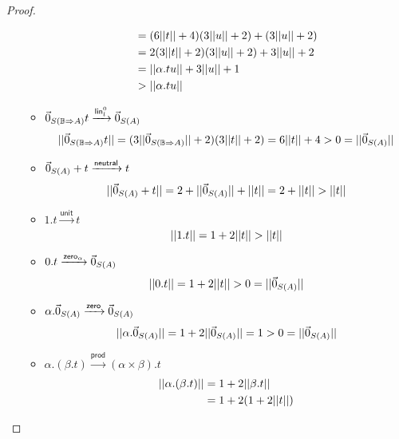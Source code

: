 \begin{proof}
\begin{itemize}
\begin{itemize}
\begin{equation*}
\begin{split}
            & = (6 ||t|| + 4)(3 ||u|| + 2) + (3 ||u|| + 2) \\
            & = 2 (3 ||t|| + 2)(3 ||u|| + 2) + 3 ||u|| + 2 \\
            & = ||\alpha . t u|| + 3 ||u|| + 1 \\
            & > ||\alpha . t u||
          \end{split}
        \end{equation*}
        \item \( \vec{0}_{S (\mathbb{B} \Rightarrow A)} t \xrightarrow{\mathsf{lin}_l^0} \vec{0}_{S (A)} \)
        \begin{equation*}
          ||\vec{0}_{S (\mathbb{B} \Rightarrow A)} t|| = (3 ||\vec{0}_{S (\mathbb{B} \Rightarrow A)}|| + 2)(3 ||t|| + 2) = 6 ||t|| + 4 > 0 = ||\vec{0}_{S (A)}||
        \end{equation*}
        \item \( \vec{0}_{S (A)} + t \xrightarrow{\mathsf{neutral}} t \)
        \begin{equation*}
          ||\vec{0}_{S (A)} + t|| = 2 + ||\vec{0}_{S (A)}|| + ||t|| = 2 + ||t|| > ||t||
        \end{equation*}
        \item \( 1 . t \xrightarrow{\mathsf{unit}} t \)
        \begin{equation*}
          ||1 . t|| = 1 + 2 ||t|| > ||t||
        \end{equation*}
        \item \( 0 . t \xrightarrow{\mathsf{zero}_\alpha} \vec{0}_{S (A)} \)
        \begin{equation*}
          ||0. t|| = 1 + 2 ||t|| > 0 = ||\vec{0}_{S (A)}||
        \end{equation*}
        \item \( \alpha . \vec{0}_{S (A)} \xrightarrow{\mathsf{zero}} \vec{0}_{S (A)} \)
        \begin{equation*}
          ||\alpha . \vec{0}_{S (A)}|| = 1 + 2 ||\vec{0}_{S (A)}|| = 1 > 0 = ||\vec{0}_{S (A)}||
        \end{equation*}
        \item \( \alpha . (\beta . t) \xrightarrow{\mathsf{prod}} (\alpha \times \beta) . t \)
        \begin{equation*}
          \begin{split}
            \size{\alpha . (\beta . t)}
            & = 1 + 2 \size{\beta . t} \\
            & = 1 + 2 (1 + 2 \size{t}) \\

\end{split}
\end{equation*}
\end{itemize}
\end{itemize}
\end{proof}
